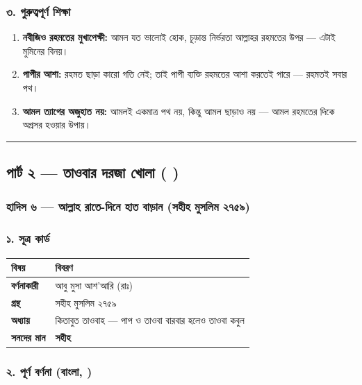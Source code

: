\subsubsection*{৩. গুরুত্বপূর্ণ শিক্ষা}

\begin{enumerate}
\item \textbf{নবীজিও রহমতের মুখাপেক্ষী:} আমল যত ভালোই হোক, চূড়ান্ত নির্ভরতা আল্লাহর রহমতের উপর — এটাই মুমিনের বিনয়।
\item \textbf{পাপীর আশা:} রহমত ছাড়া কারো গতি নেই; তাই পাপী ব্যক্তি রহমতের আশা করতেই পারে — রহমতই সবার পথ।
\item \textbf{আমল ত্যাগের অজুহাত নয়:} আমলই একমাত্র পথ নয়, কিন্তু আমল ছাড়াও নয় — আমল রহমতের দিকে অগ্রসর হওয়ার উপায়।
\end{enumerate}
\medskip\hrule\medskip

\subsection*{পার্ট ২ — তাওবার দরজা খোলা (   )}

\subsubsection*{হাদিস ৬ — আল্লাহ রাতে-দিনে হাত বাড়ান (সহীহ মুসলিম ২৭৫৯)}

\subsubsection*{১. সূত্র কার্ড}

\begin{table}[h]\centering\small
\begin{tabular}{ll}
বিষয় & বিবরণ \\
\hline
\textbf{বর্ণনাকারী} & আবু মুসা আশ'আরি (রাঃ) \\
\textbf{গ্রন্থ} & সহীহ মুসলিম ২৭৫৯ \\
\textbf{অধ্যায়} & কিতাবুত তাওবাহ — পাপ ও তাওবা বারবার হলেও তাওবা কবুল \\
\textbf{সনদের মান} & \textbf{সহীহ} \\
\hline
\end{tabular}
\end{table}

\subsubsection*{২. পূর্ণ বর্ণনা (বাংলা, )}

